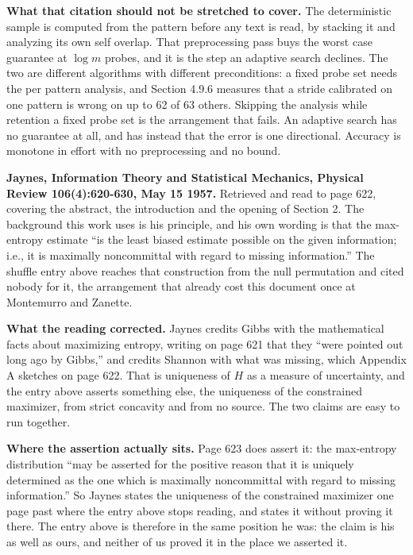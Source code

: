 \textbf{What that citation should not be stretched to cover.} The deterministic sample is computed from the pattern before any text is read, by stacking it and analyzing its own self overlap. That preprocessing pass buys the worst case guarantee at \(\log m\) probes, and it is the step an adaptive search declines. The two are different algorithms with different preconditions: a fixed probe set needs the per pattern analysis, and Section 4.9.6 measures that a stride calibrated on one pattern is wrong on up to 62 of 63 others. Skipping the analysis while retention a fixed probe set is the arrangement that fails. An adaptive search has no guarantee at all, and has instead that the error is one directional. Accuracy is monotone in effort with no preprocessing and no bound.

\textbf{Jaynes, Information Theory and Statistical Mechanics, Physical Review 106(4):620-630, May 15 1957.} Retrieved and read to page 622, covering the abstract, the introduction and the opening of Section 2. The background this work uses is his principle, and his own wording is that the max-entropy estimate
``is the least biased estimate possible on the given information; i.e., it is maximally noncommittal with regard to missing information.''
The shuffle entry above reaches that construction from the null permutation and cited nobody for it, the arrangement that already cost this document once at Montemurro and Zanette.

\textbf{What the reading corrected.} Jaynes credits Gibbs with the mathematical facts about maximizing entropy, writing on page 621 that they ``were pointed out long ago by Gibbs,'' and credits Shannon with what was missing, which Appendix A sketches on page 622. That is uniqueness of \(H\) as a measure of uncertainty, and the entry above asserts something else, the uniqueness of the constrained maximizer, from strict concavity and from no source. The two claims are easy to run together.

\textbf{Where the assertion actually sits.} Page 623 does assert it: the max-entropy distribution
``may be asserted for the positive reason that it is uniquely determined as the one which is maximally noncommittal with regard to missing information.''
So Jaynes states the uniqueness of the constrained maximizer one page past where the entry above stops reading, and states it without proving it there. The entry above is therefore in the same position he was: the claim is his as well as ours, and neither of us proved it in the place we asserted it.


